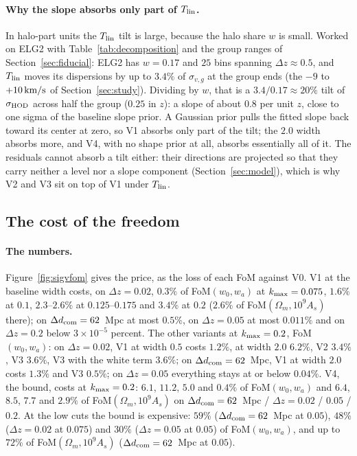 \documentclass[11pt]{article}
\newcommand{\svg}{\sigma_{v,g}}
\newcommand{\shod}{\sigma_{\rm HOD}}
\newcommand{\kms}{\,{\rm km/s}}
\newcommand{\kmax}{k_{\rm max}}
\newcommand{\dcom}{$\Delta d_{\rm com} = 62$~Mpc}
\begin{document}
\paragraph{Why the slope absorbs only part of $T_{\rm lin}$.}
In halo-part units the $T_{\rm lin}$ tilt is large, because the halo
share $w$ is small.  Worked on ELG2 with
Table~\ref{tab:decomposition} and the group ranges of
Section~\ref{sec:fiducial}: ELG2 has $w = 0.17$ and $25$ bins
spanning $\Delta z \approx 0.5$, and $T_{\rm lin}$ moves its
dispersions by up to $3.4\%$ of $\svg$ at the group ends (the $-9$ to
$+10\kms$ of Section~\ref{sec:study}).  Dividing by $w$, that is a
$3.4/0.17 \approx 20\%$ tilt of $\shod$ across half the group ($0.25$
in $z$): a slope of about $0.8$ per unit $z$, close to one sigma of
the baseline slope prior.  A Gaussian prior pulls the fitted slope
back toward its center at zero, so V1 absorbs only part of the tilt;
the $2.0$ width absorbs more, and V4, with no shape prior at all,
absorbs essentially all of it.  The residuals cannot absorb a tilt
either: their directions are projected so that they carry neither a
level nor a slope component (Section~\ref{sec:model}), which is why
V2 and V3 sit on top of V1 under $T_{\rm lin}$.

\subsection{The cost of the freedom}
\label{sec:res-cost}

\paragraph{The numbers.}
Figure~\ref{fig:sigvfom} gives the price, as the loss of each FoM
against V0.  V1 at the baseline width costs, on $\Delta z = 0.02$,
$0.3\%$ of FoM$(w_0, w_a)$ at $\kmax = 0.075$, $1.6\%$ at $0.1$,
$2.3$--$2.6\%$ at $0.125$--$0.175$ and $3.4\%$ at $0.2$ ($2.6\%$ of
FoM$(\Omega_m, 10^9 A_s)$ there); on \dcom{} at most $0.5\%$, on
$\Delta z = 0.05$ at most $0.011\%$ and on $\Delta z = 0.2$ below
$3 \times 10^{-5}$ percent.  The other variants at $\kmax = 0.2$,
FoM$(w_0, w_a)$: on $\Delta z = 0.02$, V1 at width $0.5$ costs
$1.2\%$, at width $2.0$ $6.2\%$, V2 $3.4\%$, V3 $3.6\%$, V3 with the
white term $3.6\%$; on \dcom{}, V1 at width $2.0$ costs $1.3\%$ and
V3 $0.5\%$; on $\Delta z = 0.05$ everything stays at or below
$0.04\%$.  V4, the bound, costs at $\kmax = 0.2$: $6.1$, $11.2$,
$5.0$ and $0.4\%$ of FoM$(w_0, w_a)$ and $6.4$, $8.5$, $7.7$ and
$2.9\%$ of FoM$(\Omega_m, 10^9 A_s)$ on \dcom{} / $\Delta z = 0.02$
/ $0.05$ / $0.2$.  At the low cuts the bound is expensive: $59\%$
(\dcom{} at $0.05$), $48\%$ ($\Delta z = 0.02$ at $0.075$) and
$30\%$ ($\Delta z = 0.05$ at $0.05$) of FoM$(w_0, w_a)$, and up to
$72\%$ of FoM$(\Omega_m, 10^9 A_s)$ (\dcom{} at $0.05$).
\end{document}
